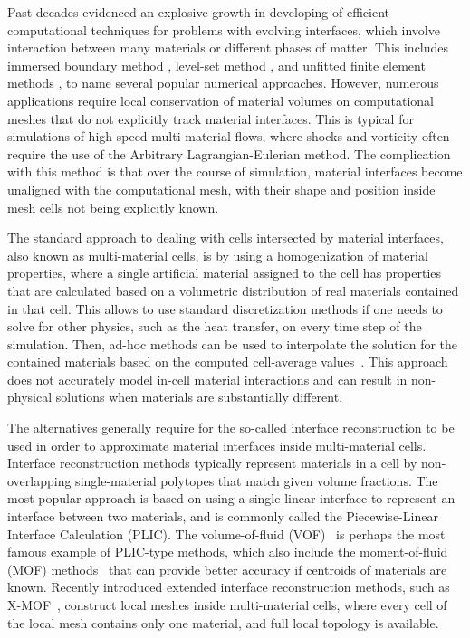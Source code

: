 \documentclass[12pt]{article}
\begin{document}
	Past decades evidenced an explosive growth in developing of efficient computational techniques for problems with evolving interfaces, which involve interaction between many materials or different phases of matter. This includes immersed boundary method \cite{peskin2002immersed}, level-set method \cite{sethian1999level}, and unfitted finite element methods \cite{belytschko2009review,burman2015cutfem}, to name several popular numerical approaches. However, numerous applications require local conservation of material volumes on computational meshes that do not explicitly track material interfaces. This is typical for simulations of high speed multi-material flows, where shocks and vorticity often require the use of the Arbitrary Lagrangian-Eulerian method. The complication with this method is that over the course of simulation, material interfaces become unaligned with the computational mesh, with their shape and position inside mesh cells not being explicitly known. 
	
    The standard approach to dealing with cells intersected by material interfaces, also known as multi-material cells, is by using a homogenization of  material properties, where a single artificial material assigned to the cell has properties that are calculated based on a volumetric distribution of real materials contained in that cell. This allows to use standard discretization methods if one needs to solve for other physics, such as the heat transfer, on every time step of the simulation. Then, ad-hoc methods can be used to interpolate the solution for the contained materials based on the computed cell-average values~\cite{dawes2013solving}. This approach does not accurately model in-cell material interactions and can result in non-physical solutions when materials are substantially different.
    
    The alternatives generally require for the so-called interface reconstruction to be used in order to approximate material interfaces inside multi-material cells. Interface reconstruction methods typically represent materials in a cell by non-overlapping single-material polytopes that match given volume fractions. The most popular approach is based on using a single linear interface to represent an interface between two materials, and is commonly called the Piecewise-Linear Interface Calculation (PLIC). The volume-of-fluid (VOF)~\cite{hirt1981volume} is perhaps the most famous example of PLIC-type methods, which also include the moment-of-fluid (MOF) methods~\cite{ahn2009adaptive} that can provide better accuracy if centroids of materials are known. Recently introduced extended interface reconstruction methods, such as X-MOF~\cite{kikinzon2018xmof}, construct local meshes inside multi-material cells, where every cell of the local mesh contains only one material, and full local topology is available.
    
\end{document}
